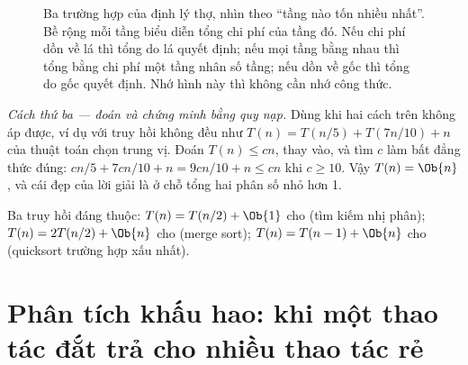 \documentclass[../../algorithm.tex]{subfiles}
\begin{document}
\begin{figure}[H]\centering
{}
\caption{Ba trường hợp của định lý thợ, nhìn theo ``tầng nào tốn nhiều nhất''. Bề rộng mỗi tầng biểu diễn tổng chi phí của tầng đó. Nếu chi phí dồn về lá thì tổng do lá quyết định; nếu mọi tầng bằng nhau thì tổng bằng chi phí một tầng nhân số tầng; nếu dồn về gốc thì tổng do gốc quyết định. Nhớ hình này thì không cần nhớ công thức.}
\label{fig:master}
\end{figure}

\emph{Cách thứ ba --- đoán và chứng minh bằng quy nạp.} Dùng khi hai cách trên không áp được, ví dụ với truy hồi không đều như \(T(n) = T(n/5) + T(7n/10) + n\) của thuật toán chọn trung vị\cite{blum1973}. Đoán \(T(n) \le cn\), thay vào, và tìm \(c\) làm bất đẳng thức đúng: \(cn/5 + 7cn/10 + n = 9cn/10 + n \le cn\) khi \(c \ge 10\). Vậy \(T(n) = \Ob{n}\), và cái đẹp của lời giải là ở chỗ tổng hai phân số nhỏ hơn 1.

Ba truy hồi đáng thuộc: \(T(n) = T(n/2) + \Ob{1}\) cho  (tìm kiếm nhị phân); \(T(n) = 2T(n/2) + \Ob{n}\) cho  (merge sort); \(T(n) = T(n-1) + \Ob{n}\) cho  (quicksort trường hợp xấu nhất).

\section{Phân tích khấu hao: khi một thao tác đắt trả cho nhiều thao tác rẻ}
\end{document}
